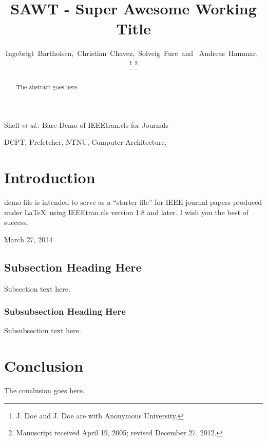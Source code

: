 \documentclass[journal]{IEEEtran}
\begin{document}
\title{SAWT - Super Awesome Working Title}

\author{Ingebrigt~Bartholsen,~Christian~Chavez,~Solveig~Fure~and ~Andreas~Hammar,~


\thanks{J. Doe and J. Doe are with Anonymous University.}
\thanks{Manuscript received April 19, 2005; revised December 27, 2012.}}

%
{Shell \MakeLowercase{\textit{et al.}}: Bare Demo of IEEEtran.cls for Journals}


\maketitle

\begin{abstract}
The abstract goes here.
\end{abstract}

\begin{IEEEkeywords}
DCPT, Prefetcher, NTNU, Computer Architecture.
\end{IEEEkeywords}
\IEEEpeerreviewmaketitle


\section{Introduction}
 demo file is intended to serve as a ``starter file''
for IEEE journal papers produced under \LaTeX\ using
IEEEtran.cls version 1.8 and later. I wish you the best of success.

\hfill March 27, 2014


\subsection{Subsection Heading Here}
Subsection text here.


\subsubsection{Subsubsection Heading Here}
Subsubsection text here.


\section{Conclusion}
The conclusion goes here.
\end{document}
